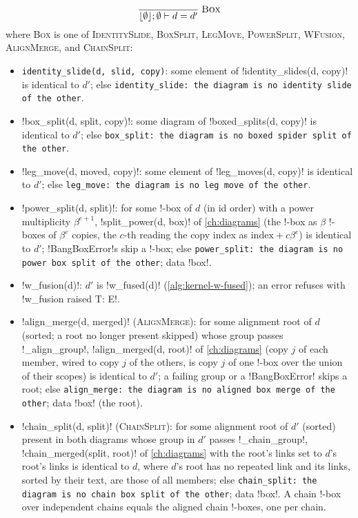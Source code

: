 \[
\frac{}{\lfloor\emptyset\rfloor;\emptyset\vdash d=d'}\;\textsc{Box}
\]
where \textsc{Box} is one of \textsc{IdentitySlide}, \textsc{BoxSplit}, \textsc{LegMove}, \textsc{PowerSplit}, \textsc{WFusion}, \textsc{AlignMerge}, and \textsc{ChainSplit}:
\begin{itemize}
\item \texttt{identity\_\allowbreak{}slide(\allowbreak{}d,\allowbreak{} slid,\allowbreak{} copy)}: some element of \py!identity_slides(d, copy)! is identical to $d'$; else \texttt{identity\_\allowbreak{}slide: the diagram is no identity slide of the other}.
\item \py!box_split(d, split, copy)!: some diagram of \py!boxed_splits(d, copy)! is identical to $d'$; else \texttt{box\_\allowbreak{}split: the diagram is no boxed spider split of the other}.
\item \py!leg_move(d, moved, copy)!: some element of \py!leg_moves(d, copy)! is identical to $d'$; else \texttt{leg\_\allowbreak{}move: the diagram is no leg move of the other}.
\item \py!power_split(d, split)!: for some !-box of $d$ (in id order) with a power multiplicity $\beta^{e+1}$, \py!split_power(d, box)! of \cref{ch:diagrams} (the !-box as $\beta$ !-boxes of $\beta^e$ copies, the $c$-th reading the copy index as $\text{index}+c\beta^e$) is identical to $d'$; \py!BangBoxError!s skip a !-box; else \texttt{power\_\allowbreak{}split: the diagram is no power box split of the other}; data \code!box!.
\item \py!w_fusion(d)!: $d'$ is \py!w_fused(d)! (\cref{alg:kernel-w-fused}); an error refuses with \code!w_fusion raised T: E!.
\item \py!align_merge(d, merged)! (\textsc{AlignMerge}): for some alignment root of $d$ (sorted; a root no longer present skipped) whose group passes \py!_align_group!, \py!align_merged(d, root)! of \cref{ch:diagrams} (copy $j$ of each member, wired to copy $j$ of the others, is copy $j$ of one !-box over the union of their scopes) is identical to $d'$; a failing group or a \py!BangBoxError! skips a root; else \texttt{align\_\allowbreak{}merge: the diagram is no aligned box merge of the other}; data \code!box! (the root).
\item \py!chain_split(d, split)! (\textsc{ChainSplit}): for some alignment root of $d'$ (sorted) present in both diagrams whose group in $d'$ passes \py!_chain_group!, \py!chain_merged(split, root)! of \cref{ch:diagrams} with the root's links set to $d$'s root's links is identical to $d$, where $d$'s root has no repeated link and its links, sorted by their text, are those of all members; else \texttt{chain\_\allowbreak{}split: the diagram is no chain box split of the other}; data \code!box!. A chain !-box over independent chains equals the aligned chain !-boxes, one per chain.
\end{itemize}

